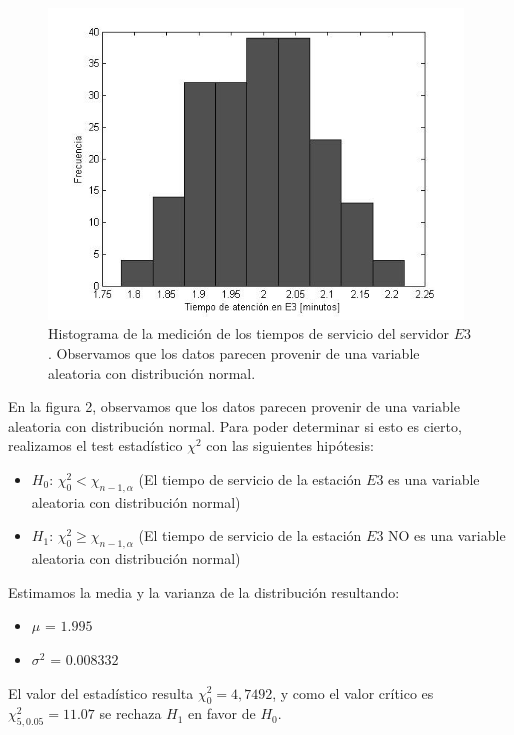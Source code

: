 \documentclass{article}
\numberwithin{equation}{section}
\numberwithin{figure}{section}
\numberwithin{table}{section}
\begin{document}
\begin{figure}
\begin{center}
\includegraphics[width=11cm]{histograma_e3}
\caption{Histograma de la medici\'on de los tiempos de servicio del servidor $E3$. Observamos que los datos parecen provenir de una variable aleatoria con distribuci\'on normal.}
\end{center}
\end{figure}

En la figura 2, observamos que los datos parecen provenir de una variable aleatoria con distribuci\'on normal.
Para poder determinar si esto es cierto, realizamos el test estad\'istico $\chi^2$ con las siguientes hip\'otesis:

\begin{itemize}
 \item {$H_{0}$:} $\chi_{0}^2 < \chi_{n-1,\alpha}$ (El tiempo de servicio de la estaci\'on $E3$ es una variable aleatoria con distribuci\'on normal)
 \item {$H_{1}$:} $\chi_{0}^2 \ge \chi_{n-1,\alpha}$ (El tiempo de servicio de la estaci\'on $E3$ NO es una variable aleatoria con distribuci\'on normal)
\end{itemize}

Estimamos la media y la varianza de la distribuci\'on resultando:
\begin{itemize}
 \item {$\mu$ =} $1.995$
 \item {$\sigma^2$ =}  $0.008332$
\end{itemize}

El valor del estad\'istico resulta $\chi_{0}^2 = 4,7492$, y como el valor
cr\'itico es $\chi_{5,0.05}^2 = 11.07$ se rechaza $H_1$ en favor de $H_0$.
\end{document}
